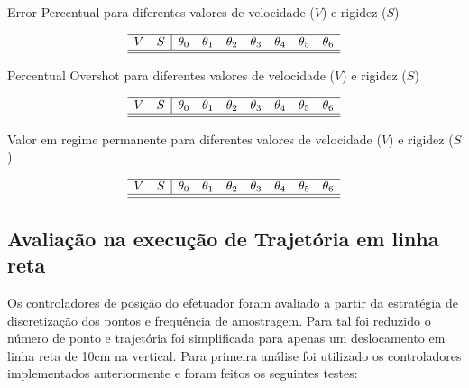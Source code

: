 \begin{table}[H]
    \centering
    \caption{Error Percentual para diferentes valores de velocidade ($V$) e rigidez ($S$)}
    $$\begin{array}{cc|ccccccc}
         \hline
         V & S & \theta_0 & \theta_1 & \theta_2 & \theta_3 & \theta_4 & \theta_5 & \theta_6\\
         \hline
         
         \hline
    \end{array}$$
    \label{tab:jointIdentification_errortable}
\end{table}

\begin{table}[H]
    \centering
    \caption{Percentual Overshot para diferentes valores de velocidade ($V$) e rigidez ($S$)}
    $$\begin{array}{cc|ccccccc}
         \hline
         V & S & \theta_0 & \theta_1 & \theta_2 & \theta_3 & \theta_4 & \theta_5 & \theta_6\\
         \hline
         
         \hline
    \end{array}$$
    \label{tab:jointIdentification_overshottable}
\end{table}

\begin{table}[H]
    \centering
    \caption{Valor em regime permanente para diferentes valores de velocidade ($V$) e rigidez ($S$)}
    $$\begin{array}{cc|ccccccc}
         \hline
         V & S & \theta_0 & \theta_1 & \theta_2 & \theta_3 & \theta_4 & \theta_5 & \theta_6\\
         \hline
         
         \hline
    \end{array}$$
    \label{tab:jointIdentification_steadstatetable}
\end{table}


\subsection{Avaliação na execução de Trajetória em linha reta}


Os controladores de posição do efetuador foram avaliado a partir da estratégia de discretização dos pontos e frequência de amostragem. Para tal foi reduzido o número de ponto e trajetória foi simplificada para apenas um deslocamento em linha reta de 10cm na vertical. Para primeira análise foi utilizado os controladores implementados anteriormente e foram feitos os seguintes testes:

